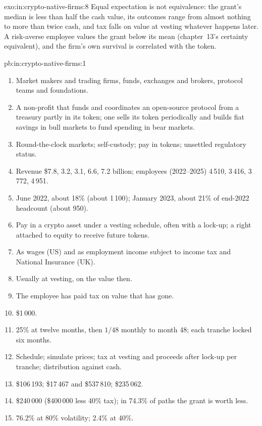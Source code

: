 \begin{solution}{exo:in:crypto-native-firms:8}
Equal expectation is not equivalence: the grant's median is less than half the cash value, its outcomes range from
almost nothing to more than twice cash, and tax falls on value at vesting whatever happens later. A risk-averse employee
values the grant below its mean (chapter~13's certainty equivalent), and the firm's own survival is correlated with the
token.
\end{solution}

\begin{solution}{pb:in:crypto-native-firms:1}
\begin{enumerate}
\item Market makers and trading firms, funds, exchanges and brokers, protocol teams and foundations.
\item A non-profit that funds and coordinates an open-source protocol from a treasury partly in its token; one sells its
token periodically and builds fiat savings in bull markets to fund spending in bear markets.
\item Round-the-clock markets; self-custody; pay in tokens; unsettled regulatory status.
\item Revenue \$7.8, 3.2, 3.1, 6.6, 7.2 billion; employees (2022--2025) 4\,510, 3\,416, 3\,772, 4\,951.
\item June 2022, about 18\% (about 1\,100); January 2023, about 21\% of end-2022 headcount (about 950).
\item Pay in a crypto asset under a vesting schedule, often with a lock-up; a right attached to equity to receive future
tokens.
\item As wages (US) and as employment income subject to income tax and National Insurance (UK).
\item Usually at vesting, on the value then.
\item The employee has paid tax on value that has gone.
\item \$1\,000.
\item 25\% at twelve months, then $1/48$ monthly to month 48; each tranche locked six months.
\item Schedule; simulate prices; tax at vesting and proceeds after lock-up per tranche; distribution against cash.
\item \$106\,193; \$17\,467 and \$537\,810; \$235\,062.
\item \$240\,000 (\$400\,000 less 40\% tax); in 74.3\% of paths the grant is worth less.
\item 76.2\% at 80\% volatility; 2.4\% at 40\%.

\end{enumerate}
\end{solution}

